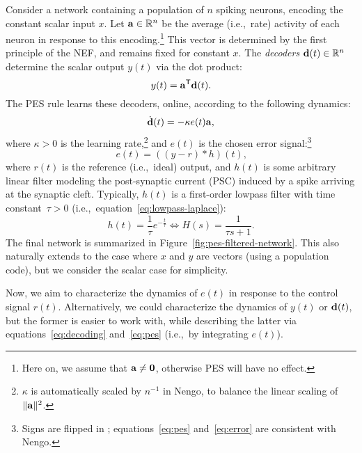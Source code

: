 Consider a network containing a population of $n$ spiking neurons, encoding the constant scalar input $x$.
Let $\mathbf{a} \in \mathbb{R}^n$ be the average (i.e.,~rate) activity of each neuron in response to this encoding.\footnote{Here on, we assume that $\mathbf{a} \ne \mathbf{0}$, otherwise PES will have no effect.}
This vector is determined by the first principle of the NEF, and remains fixed for constant $x$.
The \emph{decoders} $\mathbf{d}(t) \in \mathbb{R}^n$ determine the scalar output $y(t)$ via the dot product:
\begin{equation}
\label{eq:decoding}
y(t) = {\mathbf{a}}^\mathsf{T} \mathbf{d}(t)  \text{.}
\end{equation}
The PES rule learns these decoders, online, according to the following dynamics:
\begin{equation}
\label{eq:pes}
\dot{\mathbf{d}}(t) = -\kappa e(t) \mathbf{a} \text{,}
\end{equation}
where $\kappa > 0$ is the learning rate,\footnote{$\kappa$ is automatically scaled by $n^{-1}$ in Nengo, to balance the linear scaling of $\|\mathbf{a}\|^2$.} and $e(t)$ is the chosen error signal:\footnote{Signs are flipped in \citet{voelker2015}; equations~\ref{eq:pes} and~\ref{eq:error} are consistent with Nengo.}
\begin{equation}
\label{eq:error}
e(t) = \left((y - r) \ast h \right)(t) \text{,}
\end{equation}
where $r(t)$ is the reference (i.e.,~ideal) output, and $h(t)$ is some arbitrary linear filter modeling the post-synaptic current (PSC) induced by a spike arriving at the synaptic cleft.
Typically, $h(t)$ is a first-order lowpass filter with time constant~$\tau > 0$ (i.e.,~equation~\ref{eq:lowpass-laplace}):
\begin{equation}
\label{eq:lowpass}
h(t) = \frac{1}{\tau} e^{-\frac{t}{\tau}} \iff H(s) = \frac{1}{\tau s + 1} \text{.}
\end{equation}
The final network is summarized in Figure~\ref{fig:pes-filtered-network}.
This also naturally extends to the case where $x$ and $y$ are vectors (using a population code), but we consider the scalar case for simplicity. 

Now, we aim to characterize the dynamics of $e(t)$ in response to the control signal $r(t)$.
Alternatively, we could characterize the dynamics of $y(t)$ or $\mathbf{d}(t)$, but the former is easier to work with, while describing the latter via equations~\ref{eq:decoding} and~\ref{eq:pes} (i.e.,~by integrating $e(t)$).

